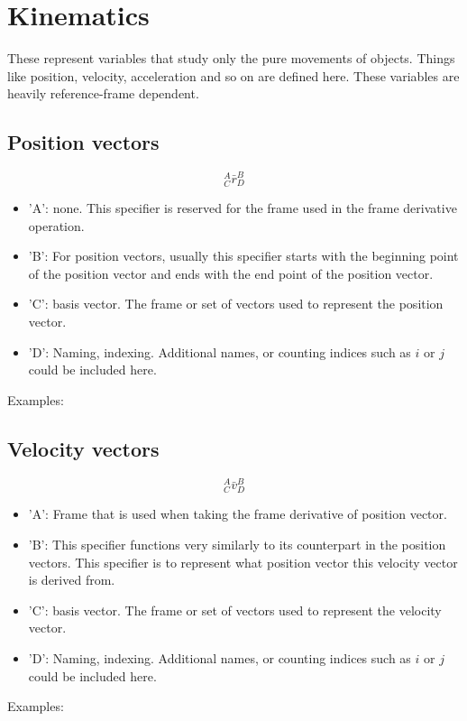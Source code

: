 \section{Kinematics}
\begin{comment}
\end{comment}
These represent variables that study only the pure movements of objects.
Things like position, velocity, acceleration and so on are defined here.
These variables are heavily reference-frame dependent.
\subsection{Position vectors}
\begin{comment}
\end{comment}
$${}^{A}_{C}\bar{r}^{B}_{D}$$
\begin{itemize}
    \item 'A': none. This specifier is reserved for the frame used in the frame derivative operation.
    \item 'B': For position vectors, usually this specifier starts with the beginning point of the position vector and ends with the end point of the position vector.
    \item 'C': basis vector. The frame or set of vectors used to represent the position vector.
    \item 'D': Naming, indexing. Additional names, or counting indices such as $i$ or $j$ could be included here.
\end{itemize}
Examples:
\subsection{Velocity vectors}
\begin{comment}
\end{comment}
$${}^{A}_{C}\bar{v}^{B}_{D}$$
\begin{itemize}
    \item 'A': Frame that is used when taking the frame derivative of position vector.
    \item 'B': This specifier functions very similarly to its counterpart in the position vectors. This specifier is to represent what position vector this velocity vector is derived from.
    \item 'C': basis vector. The frame or set of vectors used to represent the velocity vector.
    \item 'D': Naming, indexing. Additional names, or counting indices such as $i$ or $j$ could be included here.
\end{itemize}
Examples:
